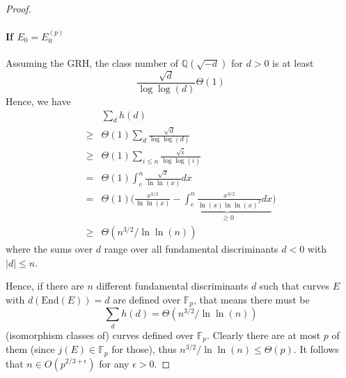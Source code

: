 \documentclass{scrartcl}
\newcommand{\F}{\mathbb{F}}
\newcommand{\End}{\mathrm{End}}
\theoremstyle{definition}
\begin{document}
\begin{proof}
    \paragraph*{If $E_0 = E_0^{(p)}$} Assuming the GRH, the class number of $\mathbb{Q}(\sqrt{-d})$ for $d > 0$ is at least
    \begin{equation*}
        \frac {\sqrt{d}} {\log\log(d)} \Theta(1)
    \end{equation*}
    Hence, we have
    \begin{align*}
        &\sum_d h(d) \\
        \geq& \Theta(1) \sum_d \frac {\sqrt{d}} {\log\log(d)} \\
        \geq& \Theta(1) \sum_{i \leq n} \frac {\sqrt{i}} {\log\log(i)} \\
        =& \Theta(1) \int_e^n \frac {\sqrt{x}} {\ln\ln(x)} dx \\
        =& \Theta(1) \Biggl( \frac {x^{3/2}} {\ln\ln(x)} - \underbrace{\int_e^n \frac {x^{3/2}} {\ln(x)\ln\ln(x)^2} dx}_{\geq 0} \Biggr) \\
        \geq& \Theta(n^{3/2}/\ln\ln(n))
    \end{align*}
    where the sums over $d$ range over all fundamental discriminants $d < 0$ with $|d| \leq n$.

    Hence, if there are $n$ different fundamental discriminants $d$ such that curves $E$ with $d(\End(E)) = d$ are defined over $\F_p$, that means there must be
    \begin{equation*}
        \sum_d h(d) = \Theta(n^{3/2}/\ln\ln(n))
    \end{equation*}
    (isomorphism classes of) curves defined over $\F_p$.
    Clearly there are at most $p$ of them (since $j(E) \in \F_p$ for those), thus $n^{3/2}/\ln\ln(n) \leq \Theta(p)$.
    It follows that $n \in O(p^{2/3 + \epsilon})$ for any $\epsilon > 0$.
\end{proof}
\end{document}
